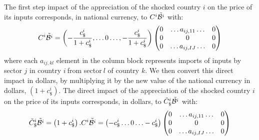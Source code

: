 \documentclass[12pt,a4paper]{paper}
\begin{document}
The first step impact of the appreciation of the shocked country $i$ on the price of its inputs corresponds, in national currency, to $C^i{\tilde{{\cal B}^i}}$ with: 
\begin{eqnarray}
C^i{\tilde{{\cal B}^i}}=\left(-\frac{c_\$^i}{1+c_\$^i},\ldots0\ldots,-\frac{c_\$^i}{1+c_\$^i} \right)\left(\begin{matrix}0&\ldots{{{a}}_{ij,11}}\ldots&0\\0&0&0\\0&\ldots{{a}_{{ij,IJ}}}\ldots&0\\\end{matrix}\right) 
\label{eq:eq4}
 \end{eqnarray}
where each ${{{a}}_{{ij,kl}}}$ element in the column block represents imports of inputs by sector $j$ in country $i~$from sector$~l$ of country $k$.
We then convert this direct impact in dollars, by multiplying it by the new value of the national currency in dollars, $\left(1+c_\$^i\right)$. The direct impact of the appreciation of the shocked country $i$ on the price of its inputs corresponds, in dollars, to ${\tilde{C}_\$^i}{\tilde{{\cal B}^i}}$ with: 
\begin{eqnarray}
{\tilde{C}_\$^i}{\tilde{{\cal B}^i}}=\left(1+c_\$^i\right).C^i{\tilde{{\cal B}^i}}=
\left(-c_\$^i\ldots0\ldots-c_\$^i\right)\left(\begin{matrix}0&\ldots{{{a}}_{ij,11}}\ldots&0\\0&0&0\\0&\ldots{{a}_{{ij,IJ}}}\ldots&0\\\end{matrix}\right) 
\label{eq:eq4}
 \end{eqnarray}



\end{document}
